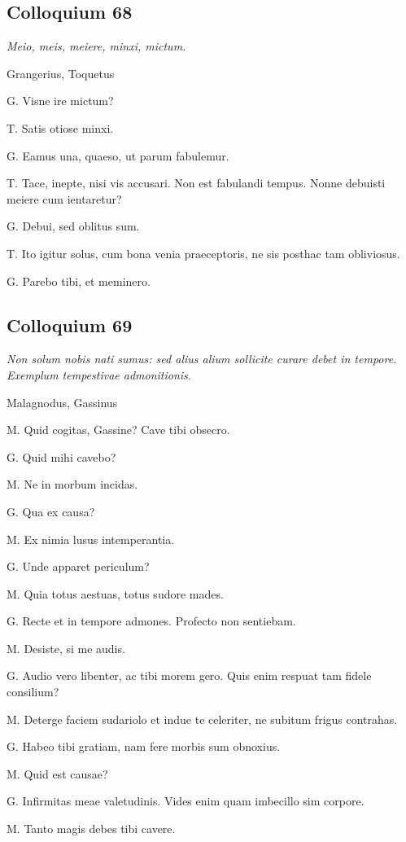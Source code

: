 \documentclass{article}
\begin{document}
\subsection{Colloquium 68}
\emph{Meio, meis, meiere, minxi, mictum.}

Grangerius, Toquetus

G. Visne ire mictum?

T. Satis otiose minxi. 

G. Eamus una, quaeso, ut parum fabulemur. 

T. Tace, inepte, nisi vis accusari. Non est fabulandi tempus. Nonne debuisti meiere cum ientaretur?

G. Debui, sed oblitus sum. 

T. Ito igitur solus, cum bona venia praeceptoris, ne sis posthac tam obliviosus. 

G. Parebo tibi, et meminero.

\subsection{Colloquium 69}
\emph{Non solum nobis nati sumus: sed alius alium sollicite curare debet in tempore. Exemplum tempestivae admonitionis.}

Malagnodus, Gassinus

M. Quid cogitas, Gassine? Cave tibi obsecro. 

G. Quid mihi cavebo?

M. Ne in morbum incidas. 

G. Qua ex causa?

M. Ex nimia lusus intemperantia. 

G. Unde apparet periculum?

M. Quia totus aestuas, totus sudore mades. 

G. Recte et in tempore admones. Profecto non sentiebam. 

M. Desiste, si me audis. 

G. Audio vero libenter, ac tibi morem gero. Quis enim respuat tam fidele consilium?

M. Deterge faciem sudariolo et indue te celeriter, ne subitum frigus contrahas. 

G. Habeo tibi gratiam, nam fere morbis sum obnoxius. 

M. Quid est causae?

G. Infirmitas meae valetudinis. Vides enim quam imbecillo sim corpore. 

M. Tanto magis debes tibi cavere. 
\end{document}
